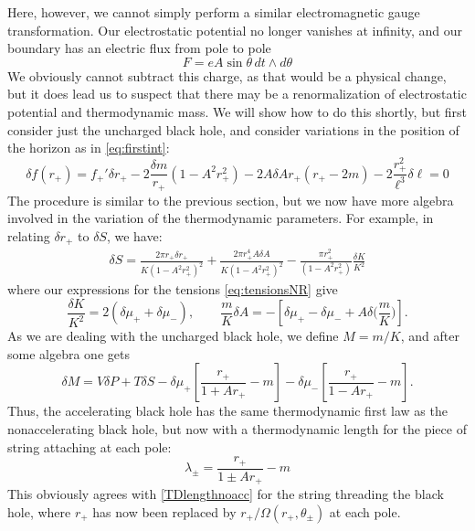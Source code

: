 \documentclass[
twoside,
openright,
frontopenright,
]{dmathesis}
\begin{document}
Here, however, we cannot simply perform a similar electromagnetic
gauge transformation. Our electrostatic potential no longer
vanishes at infinity, and our boundary has an electric flux from pole to pole
\begin{equation}
F = eA \sin\theta \, dt \wedge d\theta
\end{equation}
We obviously cannot subtract this charge, as that would be a physical change,
but it does lead us to suspect that there may be a renormalization of
electrostatic potential and thermodynamic mass. We will show how to do this
shortly, but first consider just the uncharged black hole, and consider
variations in the position of the horizon as in \cref{eq:firstint}:
\begin{equation}
\delta f(r_+) = f_+' \delta r_+  - 2 \frac{\delta m}{r_+} (1-A^2r_+^2)
- 2 A \delta A r_+ (r_+ - 2m) - 2 \frac{r_+^2}{\ell^3} \delta \ell = 0
\end{equation}
The procedure is similar to the previous section, but we now have
more algebra involved in the variation of the thermodynamic parameters.
For example, in relating $\delta r_+$ to $\delta S$, we have:
\begin{align}
\delta S = \frac{2\pi r_+ \delta r_+}{K(1-A^2 r_+^2)^2} + 
\frac{2 \pi r_+^4 A\delta A}{K (1-A^2 r_+^2)^2} - 
\frac{\pi r_+^2}{(1-A^2 r_+^2)} \frac{\delta K}{K^2}
\end{align}
where our expressions for the tensions \cref{eq:tensionsNR} give
\begin{equation}
\label{eq:deltaAKuncharged}
\frac{\delta K}{K^2} = 2 \left ( \delta \mu_+ + \delta \mu_- \right ), \qquad \frac{m}{K} \delta A = - \left [
\delta \mu_+ - \delta \mu_- + A \delta \Big(\frac{m}{K}\Big) \right].
\end{equation}
As we are dealing with the uncharged black hole, we define $M=m/K$, and after some
algebra one gets
\begin{equation}
\delta M = V\delta P + T \delta S -
\delta \mu_+ \left [ \frac{r_+}{1+Ar_+} - m \right ] -
\delta \mu_- \left [ \frac{r_+}{1-Ar_+} - m \right ] .
\label{firstaccm}
\end{equation}
Thus, the accelerating black hole has the same thermodynamic first law
as the nonaccelerating black hole, but now with a thermodynamic length
for the piece of string attaching at each pole:
\begin{equation}
\lambda_\pm = \frac{r_+}{1 \pm Ar_+} - m
\end{equation}
This obviously agrees with \cref{TDlengthnoacc} for the string
threading the black hole, where $r_+$ has now been replaced by
$r_+/\Omega(r_+,\theta_\pm)$ at each pole.
\end{document}
